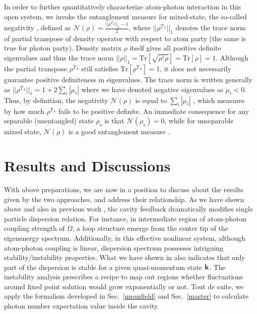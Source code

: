 \documentclass[atoms,article,submit,moreauthors,pdftex,12pt,a4paper]{mdpi}
\begin{document}
In order to further quantitatively characterize atom-photon interaction in this open system, we invoke the entanglement measure for mixed-state, the so-called negativity \cite{negativity}, defined as $\mathcal{N}(\rho)=\frac{||\rho^{T_A}||_1-1}{2}$, where $||\rho^{T_A}||_1$ denotes the trace norm of partial transpose of density operator with respect to atom party (the same is true for photon party). Density matrix $\rho$ itself gives all positive definite eigenvalues and thus the trace norm $||\rho||_1=\text{Tr}[\sqrt{\rho^\dagger\rho}]=\text{Tr}[\rho]=1$. Although the partial transpose $\rho^{T_A}$ still satisfies $\text{Tr}[\rho^{T_A}]=1$, it does not necessarily guarantee positive definiteness in eigenvalues. The trace norm is written generally as $||\rho^{T_A}||_1=1+2\sum_i|\mu_i|$ where we have denoted negative eigenvalues as $\mu_i<0$. Thus, by definition, the negativity $\mathcal{N}(\rho)$ is equal to $\sum_i|\mu_i|$ 
, which measures by how much $\rho^{T_A}$ fails to be positive definite. An immediate consequence for any separable (unentangled) state $\rho_s$ is that $\mathcal{N}(\rho_s)=0$, while for unseparable mixed state, $\mathcal{N}(\rho)$ is a good entanglement measure \cite{negativity}. 

\section{Results and Discussions} \label{relation}

With above preparations, we are now in a position to discuss about the results given by the two approaches, and address their relationship. As we have shown above and also in previous work \cite{cavitySOC}, the cavity feedback dramatically modifies single particle dispersion relation. For instance, in intermediate region of atom-photon coupling strength of $\Omega$, a loop structure emerge from the center tip of the eigenenergy spectrum. Additionally, in this effective nonlinear system, although atom-photon coupling is linear, dispersion spectrum possesses intriguing stability/instability properties. What we have shown in \cite{cavitySOC} also indicates that only part of the dispersion is stable for a given quasi-momentum state ${\bf k}$. The instability analysis prescribes a recipe to map out regions whether fluctuations around fixed point solution would grow exponentially or not. Tout de suite, we apply the formalism developed in Sec.~\ref{meanfield} and Sec.~\ref{master} to calculate photon number expectation value inside the cavity.
\end{document}

